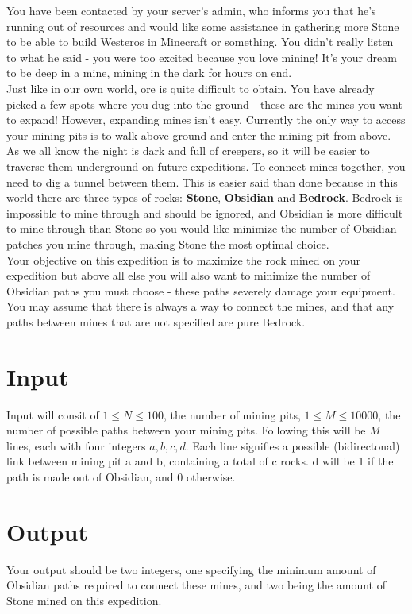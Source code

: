 
\noindent You have been contacted by your server's admin, who informs you that he's running out of resources and would
like some assistance in gathering more Stone to be able to build Westeros in Minecraft or something. You didn't really
listen to what he said - you were too excited because you love mining! It's your dream to be deep in a mine, mining in
the dark for hours on end.\\

\noindent Just like in our own world, ore is quite difficult to obtain. You have already picked a few spots where you
dug into the ground - these are the mines you want to expand! However, expanding mines isn't easy. Currently the only
way to access your mining pits is to walk above ground and enter the mining pit from above. As we all know the night
is dark and full of creepers, so it will be easier to traverse them underground on future expeditions. To connect mines
together, you need to dig a tunnel between them. This is easier said than done because in this world there are three
types of rocks: \textbf{Stone}, \textbf{Obsidian} and \textbf{Bedrock}. Bedrock is impossible to mine through and should
be ignored, and Obsidian is more difficult to mine through than Stone so you would like minimize the number of Obsidian
patches you mine through, making Stone the most optimal choice.\\

\noindent Your objective on this expedition is to maximize the rock mined on your expedition but above all else you will
also want to minimize the number of Obsidian paths you must choose - these paths severely damage your equipment. You may
assume that there is always a way to connect the mines, and that any paths between mines that are not specified are pure
Bedrock.

\section*{Input}
Input will consit of $1 \leq N \leq 100$, the number of mining pits, $1 \leq M \leq 10000$, the number of possible paths
between your mining pits. Following this will be $M$ lines, each with four integers $a,b,c,d$. Each line signifies a
possible (bidirectonal) link between mining pit a and b, containing a total of c rocks. d will be 1 if the path is made
out of Obsidian, and 0 otherwise.

\section*{Output}
Your output should be two integers, one specifying the minimum amount of Obsidian paths required to connect these mines,
and two being the amount of Stone mined on this expedition.